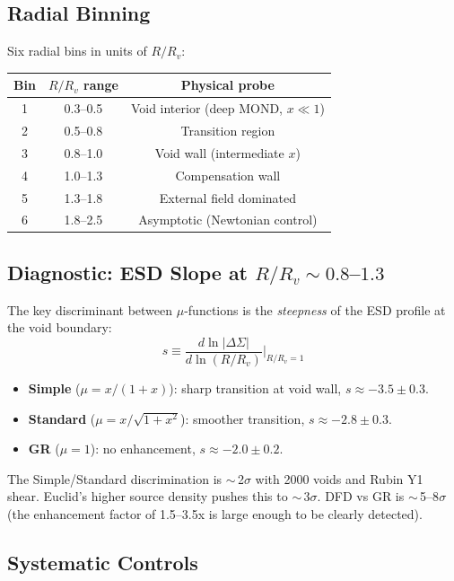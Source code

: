 \documentclass[11pt,a4paper]{article}
\begin{document}
\subsection{Radial Binning}

Six radial bins in units of $R/R_v$:
\begin{center}
\begin{tabular}{ccc}
\toprule
Bin & $R/R_v$ range & Physical probe \\
\midrule
1 & 0.3--0.5 & Void interior (deep MOND, $x \ll 1$) \\
2 & 0.5--0.8 & Transition region \\
3 & 0.8--1.0 & Void wall (intermediate $x$) \\
4 & 1.0--1.3 & Compensation wall \\
5 & 1.3--1.8 & External field dominated \\
6 & 1.8--2.5 & Asymptotic (Newtonian control) \\
\bottomrule
\end{tabular}
\end{center}

\subsection{Diagnostic: ESD Slope at $R/R_v \sim 0.8$--$1.3$}

The key discriminant between $\mu$-functions is the \emph{steepness}
of the ESD profile at the void boundary:
\begin{equation}
s \equiv \frac{d\ln|\Delta\Sigma|}{d\ln(R/R_v)}\bigg|_{R/R_v = 1}
\end{equation}

\begin{itemize}
\item \textbf{Simple} ($\mu = x/(1+x)$): sharp transition at void wall,
  $s \approx -3.5 \pm 0.3$.
\item \textbf{Standard} ($\mu = x/\sqrt{1+x^2}$): smoother transition,
  $s \approx -2.8 \pm 0.3$.
\item \textbf{GR} ($\mu = 1$): no enhancement, $s \approx -2.0 \pm 0.2$.
\end{itemize}

The Simple/Standard discrimination is $\sim$\,2$\sigma$ with 2000 voids
and Rubin Y1 shear.  Euclid's higher source density pushes this to
$\sim$\,3$\sigma$.  DFD vs GR is $\sim$\,5--8$\sigma$ (the enhancement
factor of 1.5--3.5x is large enough to be clearly detected).

\subsection{Systematic Controls}
\end{document}
